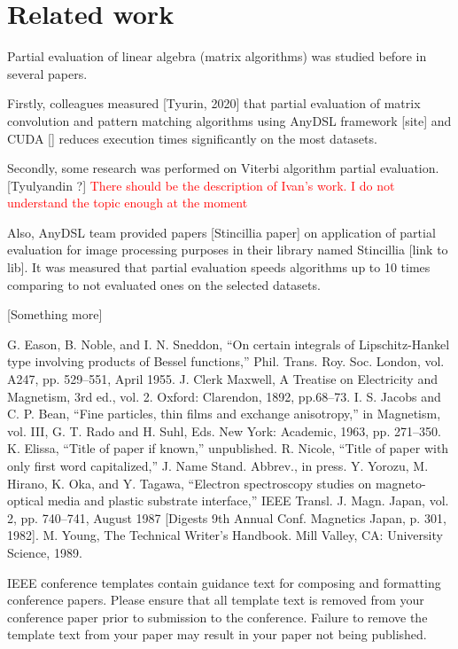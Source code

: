 \documentclass[conference]{IEEEtran}
\begin{document}
\section{Related work}

Partial evaluation of linear algebra (matrix algorithms) was studied before in several papers.

Firstly, colleagues measured [Tyurin, 2020] that partial evaluation of matrix convolution and pattern matching algorithms using AnyDSL framework [site] and CUDA [] reduces execution times significantly on the most datasets.

Secondly, some research was performed on Viterbi algorithm partial evaluation. [Tyulyandin ?] \textcolor{red}{There should be the description of Ivan's work. I do not understand the topic enough at the moment}

Also, AnyDSL team provided papers [Stincillia paper] on application of partial evaluation for image processing purposes in their library named Stincillia [link to lib]. It was measured that partial evaluation speeds algorithms up to 10 times comparing to not evaluated ones on the selected datasets.

[Something more]


\begin{thebibliography}{00}
 G. Eason, B. Noble, and I. N. Sneddon, ``On certain integrals of Lipschitz-Hankel type involving products of Bessel functions,'' Phil. Trans. Roy. Soc. London, vol. A247, pp. 529--551, April 1955.
 J. Clerk Maxwell, A Treatise on Electricity and Magnetism, 3rd ed., vol. 2. Oxford: Clarendon, 1892, pp.68--73.
 I. S. Jacobs and C. P. Bean, ``Fine particles, thin films and exchange anisotropy,'' in Magnetism, vol. III, G. T. Rado and H. Suhl, Eds. New York: Academic, 1963, pp. 271--350.
 K. Elissa, ``Title of paper if known,'' unpublished.
 R. Nicole, ``Title of paper with only first word capitalized,'' J. Name Stand. Abbrev., in press.
 Y. Yorozu, M. Hirano, K. Oka, and Y. Tagawa, ``Electron spectroscopy studies on magneto-optical media and plastic substrate interface,'' IEEE Transl. J. Magn. Japan, vol. 2, pp. 740--741, August 1987 [Digests 9th Annual Conf. Magnetics Japan, p. 301, 1982].
 M. Young, The Technical Writer's Handbook. Mill Valley, CA: University Science, 1989.
\end{thebibliography}
\vspace{12pt}
\color{red}
IEEE conference templates contain guidance text for composing and formatting conference papers. Please ensure that all template text is removed from your conference paper prior to submission to the conference. Failure to remove the template text from your paper may result in your paper not being published.
\end{document}
